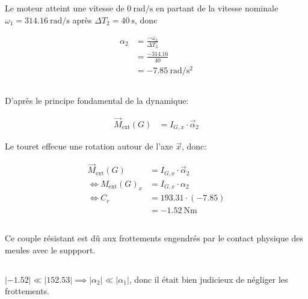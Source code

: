 \documentclass{article}
\begin{document}
Le moteur atteint une vitesse de $\SI{0}{\radian\per\second}$ en partant de la vitesse nominale $\omega_1 = \SI{314.16}{\radian\per\second}$ après $\Delta T_2 = \SI{40}{\second}$, donc

\begin{equation*}
  \begin{split}
    \alpha_2 &= \frac{-\omega_1}{\Delta T_2}\\
             &= \frac{-314.16}{40} \\
             &= \SI{-7.85}{\radian\per\second\squared}
  \end{split}
\end{equation*}

\subsection{}

D'après le principe fondamental de la dynamique:

\begin{equation*}
  \begin{split}
    \vec M_{\text{ext}}(G) &= I_{G,x} \cdot \vec \alpha_2
  \end{split}
\end{equation*}

Le touret effecue une rotation autour de l'axe $\vec x$, donc:

\begin{equation*}
  \begin{split}
    \vec M_{\text{ext}}(G) &= I_{G,x} \cdot \vec \alpha_2 \\
    \iff M_{\text{ext}}(G)_x &= I_{G,x} \cdot \alpha_2 \\
    \iff C_r &= 193.31 \cdot (-7.85)\\
    &= \SI{-1.52}{\newton\meter}
  \end{split}
\end{equation*}

\subsection{}

Ce couple résistant est dû aux frottements engendrés par le contact physique des meules avec le suppport.

\subsection{}

$|-1.52| \ll |152.53| \implies |\alpha_2| \ll |\alpha_1|$, donc il était bien judicieux de négliger les frottements.
\end{document}
